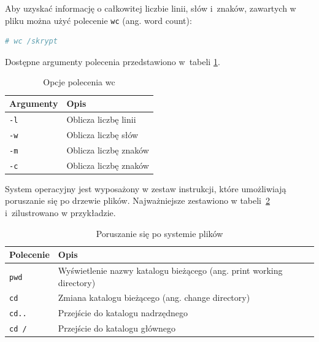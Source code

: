 \documentclass[11pt,twoside,a4paper]{article}
\begin{document}
\begin{example}\label{ex:wys} 

Aby uzyskać informację o całkowitej liczbie linii, słów i~znaków, zawartych w pliku można użyć polecenie \lstinline{wc} (ang. word count): 

\begin{lstlisting}[language=bash]
# wc /skrypt
\end{lstlisting}

Dostępne argumenty polecenia przedstawiono w~tabeli \ref{tab:opcjeWC}. 


\begin{table}[h!]
\centering
\caption{Opcje polecenia wc}
\setlength{\arrayrulewidth}{1pt}
\setlength{\tabcolsep}{6pt}
\renewcommand{\arraystretch}{1.2}
\begin{tabular}{ |p{}|p{}|}
\hline \rowcolor{gray}
\textbf{Argumenty} & \textbf{Opis} \\ \hline
\mbox{\lstinline{-l}} & Oblicza liczbę linii \\ \hline
\mbox{\lstinline{-w}} & Oblicza liczbę słów \\ \hline 
\mbox{\lstinline{-m}} & Oblicza liczbę znaków \\ \hline
\mbox{\lstinline{-c}} & Oblicza liczbę znaków  \\ \hline
\end{tabular}
\label{tab:opcjeWC}
\end{table}

\begin{example}

System operacyjny jest wyposażony w zestaw instrukcji, które umożliwiają poruszanie się po drzewie plików. Najważniejsze zestawiono w tabeli~\ref{tab:poruszanie} i~zilustrowano w przykładzie.

\begin{table}[h!]
\centering
\caption{Poruszanie się po systemie plików}
\setlength{\arrayrulewidth}{1pt}
\setlength{\tabcolsep}{6pt}
\renewcommand{\arraystretch}{1.2}
\begin{tabular}{ |p{}|p{}|}
\hline \rowcolor{gray}
\textbf{Polecenie} & \textbf{Opis} \\ \hline
\mbox{\lstinline{pwd}} & Wyświetlenie nazwy katalogu bieżącego (ang. print working directory) \\ \hline 
\mbox{\lstinline{cd}}  & Zmiana katalogu bieżącego (ang. change directory) \\ \hline
\mbox{\lstinline{cd..}} & Przejście do katalogu nadrzędnego \\ \hline 
\mbox{\lstinline{cd /}} & Przejście do katalogu głównego \\ \hline 
\end{tabular}
\label{tab:poruszanie}
\end{table}
\end{example}




\end{example}
\end{document}
